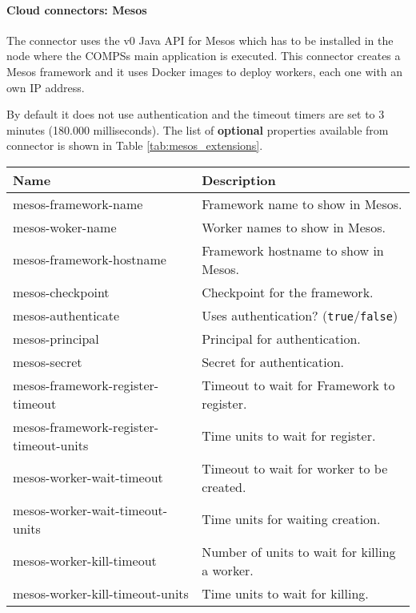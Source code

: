 \paragraph{Cloud connectors: Mesos}

The connector uses the v0 Java API for Mesos which has to be installed in the node where the COMPSs main application is executed.
This connector creates a Mesos framework and it uses Docker images to deploy workers, each one with an own IP address.

By default it does not use authentication and the timeout timers are set to 3 minutes (180.000 milliseconds). The list of \textbf{optional}
properties available from connector is shown in Table \ref{tab:mesos_extensions}.

\begin{table}[!ht]
\def\arraystretch{1.2}
\centering
\begin{tabularx}{\linewidth}{|l|X|} \hline
	\textbf{Name} &\textbf{Description} \\ \hline
	mesos-framework-name & Framework name to show in Mesos.\\ \hline
  mesos-woker-name & Worker names to show in Mesos.\\ \hline
  mesos-framework-hostname & Framework hostname to show in Mesos.\\ \hline
	mesos-checkpoint  & Checkpoint for the framework.\\ \hline
	mesos-authenticate & Uses authentication? (\texttt{true}/\texttt{false}) \\ \hline
	mesos-principal & Principal for authentication.\\ \hline
	mesos-secret  & Secret for authentication.\\ \hline

	mesos-framework-register-timeout & Timeout to wait for Framework to register.\\ \hline
	mesos-framework-register-timeout-units&  Time units to wait for register.\\ \hline
	mesos-worker-wait-timeout & Timeout to wait for worker to be created.\\ \hline
	mesos-worker-wait-timeout-units  & Time units for waiting creation. \\ \hline
	mesos-worker-kill-timeout  & Number of units to wait for killing a worker. \\ \hline
	mesos-worker-kill-timeout-units  & Time units to wait for killing.\\ \hline


\end{tabularx}
\end{table}
